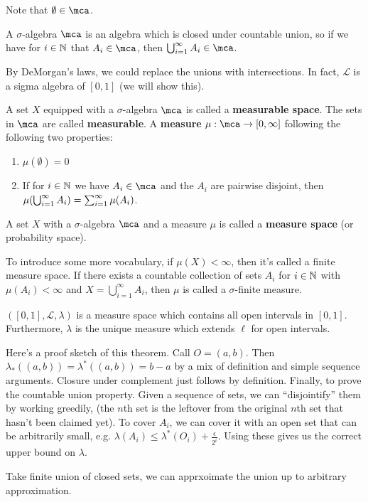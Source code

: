 Note that $\emptyset \in \mca$.
\begin{definition}
    A $\sigma$-algebra $\mca$ is an algebra which is closed under countable union, so if we have for $i \in \operatorname{\mathbb{N}}$ that $A_i \in \mca$, then
    $\bigcup_{i = 1}^{\infty} A_i \in \mca$.
\end{definition}
By DeMorgan's laws, we could replace the unions with intersections. In fact, $\mathcal{L}$ is a sigma algebra of $[0, 1]$ (we will show this).
\begin{definition}
A set $X$ equipped with a $\sigma$-algebra $\mca$ is called a \textbf{measurable space}. The sets in $\mca$ are called \textbf{measurable}.
A \textbf{measure} $\mu: \mca \to [0, \infty]$ following the following two properties:
\begin{enumerate}
    \item $\mu(\emptyset) = 0$
    \item If for $i \in \operatorname{\mathbb{N}}$ we have $A_i \in \mca$ and the $A_i$ are pairwise disjoint, then $\mu\qty(\bigcup_{i = 1}^{\infty} A_i) = \sum_{i = 1}^{\infty} \mu (A_i)$.
\end{enumerate}
\end{definition}
\begin{definition}
    A set $X$ with a $\sigma$-algebra $\mca$ and a measure $\mu$ is called a \textbf{measure space} (or probability space).
\end{definition}
To introduce some more vocabulary, if $\mu(X) < \infty$, then it's called a finite measure space. If there exists a countable
collection of sets $A_i$ for $i \in \operatorname{\mathbb{N}}$ with $\mu(A_i) < \infty$ and $X = \bigcup_{i = 1}^{\infty} A_i$, then $\mu$ is called a $\sigma$-finite measure.
\begin{theorem}
   $([0,1], \mathcal{L}, \lambda)$ is a measure space which contains all open intervals in $[0, 1]$. Furthermore, $\lambda$ is the unique measure which extends $\ell$ for open intervals.
\end{theorem}
Here's a proof sketch of this theorem. Call $O = (a, b)$. Then $\lambda_*((a, b)) = \lambda^*((a, b)) = b - a$ by a mix of definition and simple sequence arguments. Closure under complement
just follows by definition. Finally, to prove the countable union property. Given a sequence of sets, we can ``disjointify'' them
by working greedily, (the $n$th set is the leftover from the original $n$th set that hasn't been claimed yet). To cover $A_i$, we can cover it with an open set that can be
arbitrarily small, e.g. $\lambda(A_i) \leq \lambda^*(O_i) + \frac{\epsilon}{2^i}$. Using these gives us the correct upper bound on $\lambda$.

Take finite union of closed sets, we can apprxoimate the union up to arbitrary approximation.